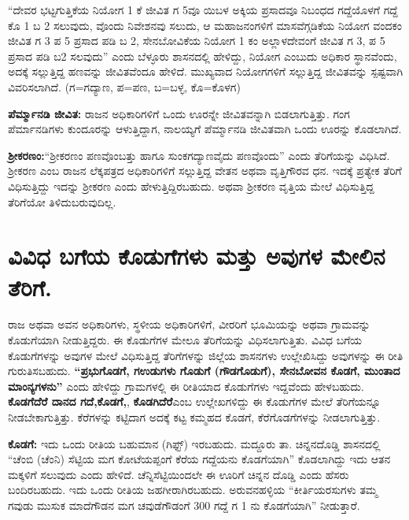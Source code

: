 “ದೇವರ ಭಟ್ಟಗುತ್ತಿಕೆಯ ನಿಯೋಗ 1 ಕೆ ಜೀವಿತ ಗ 5ವೂ ಯಿಬಳ ಅಕ್ಕಿಯ ಪ್ರಸಾದವೂ ನಿಬಂಧದ ಗದ್ದೆಯೊಳಗೆ ಗದ್ದೆ ಕೊ 1 ಬ 2 ಸಲುವುದು, ವೊಂದು ನಿವೇಶನವು ಸಲುದು, ಆ ಮಹಾಜನಂಗಳಿಗೆ ಮಾಸವೆಗ್ಗಡಿಕೆಯ ನಿಯೋಗ ವಂದಕಂ ಜೀವಿತ ಗ 3 ಪ 5 ಪ್ರಸಾದ ಪಡಿ ಬ 2, ಸೇನಬೋವಿಕೆಯ ನಿಯೋಗ 1 ಕಂ ಅಲ್ಲಾಳದೇವಂಗೆ ಜೀವಿತ ಗ 3, ಪ 5 ಪ್ರಸಾದ ಪಡಿ ಬ2 ಸಲವುದು” ಎಂದು ಬೆಳ್ಳೂರು ಶಾಸನದಲ್ಲಿ ಹೇಳಿದ್ದು, ನಿಯೋಗ ಎಂಬುದು ಅಧಿಕಾರ ಸ್ಥಾನವೆಂದು, ಅದಕ್ಕೆ ಸಲ್ಲುತ್ತಿದ್ದ ಹಣವನ್ನು ಜೀವಿತವೆಂದೂ ಹೇಳಿದೆ. ಮುಖ್ಯವಾದ ನಿಯೋಗಗಳಿಗೆ ಸಲ್ಲುತ್ತಿದ್ದ ಜೀವಿತವನ್ನು ಸ್ಪಷ್ಟವಾಗಿ ವಿವರಿಸಲಾಗಿದೆ. (ಗ=ಗದ್ಯಾಣ, ಪ=ಪಣ, ಬ=ಬಳ್ಳ, ಕೊ=ಕೊಳಗ)

\textbf{ಪೆರ್ಮ್ಮಾನಡಿ ಜೀವಿತ:} ರಾಜನ ಅಧಿಕಾರಿಗಳಿಗೆ ಒಂದು ಊರನ್ನೇ ಜೀವಿತವನ್ನಾಗಿ ಬಿಡಲಾಗುತ್ತಿತ್ತು. ಗಂಗ ಪೆರ್ಮಾನಡಿಗಳು ಕುಂದೂರನ್ನು ಆಳುತ್ತಿದ್ದಾಗ, ನಾಲಯ್ಯಗೆ ಪೆರ್ಮ್ಮಾನಡಿ ಜೀವಿತವಾಗಿ ಒಂದು ಊರನ್ನು ಕೊಡಲಾಗಿದೆ.

\textbf{ಶ‍್ರೀಕರಣಂ:}“ಶ‍್ರೀಕರಣಂ ಪಣವೊಂಬತ್ತು ಹಾಗೂ ಸುಂಕಗದ್ಯಾಣವೈದು ಪಣವೊಂದು” ಎಂದು ತೆರಿಗೆಯನ್ನು ವಿಧಿಸಿದೆ. ಶ‍್ರೀಕರಣ ಎಂಬ ರಾಜನ ಲೆಕ್ಕಪತ್ರದ ಅಧಿಕಾರಿಗಳಿಗೆ ಸಲ್ಲುತ್ತಿದ್ದ ವೇತನ ಅಥವಾ ವೃತ್ತಿಗೌರವ ಧನ. ಇದಕ್ಕೆ ಪ್ರತ್ಯೇಕ ತೆರಿಗೆ ವಿಧಿಸುತ್ತಿದ್ದು ಇದನ್ನು ಶ‍್ರೀಕರಣ ಎಂದು ಹೇಳುತ್ತಿದ್ದಿರಬಹುದು. ಅಥವಾ ಶ‍್ರೀಕರಣ ವೃತ್ತಿಯ ಮೇಲೆ ವಿಧಿಸುತ್ತಿದ್ದ ತೆರಿಗೆಯೋ ತಿಳಿದುಬರುವುದಿಲ್ಲ.


\section{ವಿವಿಧ ಬಗೆಯ ಕೊಡುಗೆಗಳು ಮತ್ತು ಅವುಗಳ ಮೇಲಿನ ತೆರಿಗೆ.}

ರಾಜ ಅಥವಾ ಅವನ ಅಧಿಕಾರಿಗಳು, ಸ್ಥಳೀಯ ಅಧಿಕಾರಿಗಳಿಗೆ, ವೀರರಿಗೆ ಭೂಮಿಯನ್ನು ಅಥವಾ ಗ್ರಾಮವನ್ನು ಕೊಡುಗೆಯಾಗಿ ನೀಡುತ್ತಿದ್ದರು. ಈ ಕೊಡುಗೆಗಳ ಮೇಲೂ ತೆರಿಗೆಯನ್ನು ವಿಧಿಸಲಾಗುತ್ತಿತು. ವಿವಿಧ ಬಗೆಯ ಕೊಡುಗೆಗಳನ್ನು ಅವುಗಳ ಮೇಲೆ ವಿಧಿಸುತ್ತಿದ್ದ ತೆರಿಗೆಗಳನ್ನು ಜಿಲ್ಲೆಯ ಶಾಸನಗಳು ಉಲ್ಲೇಖಿಸಿದ್ದು ಅವುಗಳನ್ನು ಈ ರೀತಿ ಗುರುತಿಸಬಹುದು. \textbf{“ಪ್ರಭುಗೊಡಗೆ, ಗಉಡುಗಳು ಗೊಡುಗೆ (ಗೌಡಗೊಡುಗೆ), ಸೇನಬೋವನ ಕೊಡಗೆ, ಮುಂತಾದ ಮಾಂನ್ಯಗಳನು”} ಎಂದು ಹೇಳಿದ್ದು ಗ್ರಾಮಗಳಲ್ಲಿ ಈ ರೀತಿಯಾದ ಕೊಡುಗೆಗಳು ಇದ್ದವೆಂದು ಹೇಳಬಹುದು. \textbf{ಕೊಡಗೆದೆರೆ ದಾನದ ಗದೆ,}\textbf{ಕೊಡಗೆ,}, \textbf{ಕೊಡಗಿದೆರೆ}ಎಂಬ ಉಲ್ಲೇಖಗಳಿದ್ದು ಈ ಕೊಡುಗೆಗಳ ಮೇಲೆ ತೆರಿಗೆಯನ್ನೂ ನೀಡಬೇಕಾಗುತ್ತಿತ್ತು. ಕೆರೆಗಳನ್ನು ಕಟ್ಟಿದಾಗ ಅದಕ್ಕೆ ಕಟ್ಟ ಕಮ್ಮಹದ ಕೊಡಗೆ, ಕೆರೆಗೊಡಗೆಗಳನ್ನು ನೀಡಲಾಗುತ್ತಿತ್ತು.

\textbf{ಕೊಡಗೆ:} ಇದು ಒಂದು ರೀತಿಯ ಬಹುಮಾನ (ಗಿಫ್ಟ್​) ಇರಬಹುದು. ಮದ್ದೂರು ತಾ. ಚಿನ್ನನದೊಡ್ಡಿ ಶಾಸನದಲ್ಲಿ “ಚೆಂಬಿ (ಚೆಂನಿ) ಸೆಟ್ಟಿಯ ಮಗ ಕೋಟೆಯಪ್ಪಂಗೆ ಕೆರೆಯ ಗದ್ದೆಯನು ಕೊಡಗೆಯಾಗಿ” ಕೊಡಲಾಗಿದ್ದು ಇದು ಆತನ ಮಕ್ಕಳಿಗೆ ಸಲುವುದು ಎಂದು ಹೇಳಿದೆ. ಚೆನ್ನಿಸೆಟ್ಟಿಯಿಂದಲೇ ಈ ಊರಿಗೆ ಚಿನ್ನನ ದೊಡ್ಡಿ ಎಂದು ಹೆಸರು ಬಂದಿರಬಹುದು. ಇದು ಒಂದು ರೀತಿಯ ಜಹಗೀರಾಗಿರಬಹುದು. ಅರುವನಹಳ್ಳಿಯ “ಕೀರ್ತಿಯರಸುಗಳು ತಮ್ಮ ಗವುಡು ಮುಸುಕ ಮಾದೆಗೌಡನ ಮಗ ಚವುಡೆಗೌಡಂಗೆ 300 ಗದ್ದೆ ಗ 1 ನು ಕೊಡಗೆಯಾಗಿ” ನೀಡುತ್ತಾರೆ.

